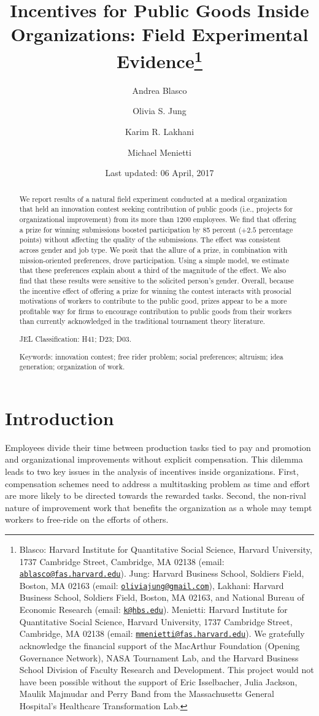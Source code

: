 \documentclass[12pt, titlepage]{article}
\institute{}
\title{Incentives for Public Goods Inside Organizations: Field Experimental
Evidence\thanks{Blasco: Harvard Institute for Quantitative Social Science, Harvard
University, 1737 Cambridge Street, Cambridge, MA 02138 (email:
\href{mailto:ablasco@fas.harvard.edu}{\nolinkurl{ablasco@fas.harvard.edu}}).
Jung: Harvard Business School, Soldiers Field, Boston, MA 02163 (email:
\href{mailto:oliviajung@gmail.com}{\nolinkurl{oliviajung@gmail.com}}),
Lakhani: Harvard Business School, Soldiers Field, Boston, MA 02163, and
National Bureau of Economic Research (email:
\href{mailto:k@hbs.edu}{\nolinkurl{k@hbs.edu}}). Menietti: Harvard
Institute for Quantitative Social Science, Harvard University, 1737
Cambridge Street, Cambridge, MA 02138 (email:
\href{mailto:mmenietti@fas.harvard.edu}{\nolinkurl{mmenietti@fas.harvard.edu}}).
We gratefully acknowledge the financial support of the MacArthur
Foundation (Opening Governance Network), NASA Tournament Lab, and the
Harvard Business School Division of Faculty Research and Development.
This project would not have been possible without the support of Eric
Isselbacher, Julia Jackson, Maulik Majmudar and Perry Band from the
Massachusetts General Hospital's Healthcare Transformation Lab.}}
\author{Andrea Blasco \and Olivia S. Jung \and Karim R. Lakhani \and Michael Menietti}
\date{Last updated: 06 April, 2017}
\begin{document}
\maketitle
\begin{abstract}
We report results of a natural field experiment conducted at a medical
organization that held an innovation contest seeking contribution of
public goods (i.e., projects for organizational improvement) from its
more than 1200 employees. We find that offering a prize for winning
submissions boosted participation by 85 percent (\(+2.5\) percentage
points) without affecting the quality of the submissions. The effect was
consistent across gender and job type. We posit that the allure of a
prize, in combination with mission-oriented preferences, drove
participation. Using a simple model, we estimate that these preferences
explain about a third of the magnitude of the effect. We also find that
these results were sensitive to the solicited person's gender. Overall,
because the incentive effect of offering a prize for winning the contest
interacts with prosocial motivations of workers to contribute to the
public good, prizes appear to be a more profitable way for firms to
encourage contribution to public goods from their workers than currently
acknowledged in the traditional tournament theory literature.

\smallskip\noindent 
JEL Classification: H41; D23; D03.

\smallskip\noindent 
Keywords: innovation contest; free rider problem; social preferences; altruism; idea generation; organization of work.
\end{abstract}


\clearpage

\section{Introduction}\label{introduction}

Employees divide their time between production tasks tied to pay and
promotion and organizational improvements without explicit compensation.
This dilemma leads to two key issues in the analysis of incentives
inside organizations. First, compensation schemes need to address a
multitasking problem
\citep{holmstrom1991multitask, hellmann2011incentives, manso2011motivating}
as time and effort are more likely to be directed towards the rewarded
tasks. Second, the non-rival nature of improvement work that benefits
the organization as a whole may tempt workers to free-ride on the
efforts of others.
\end{document}
